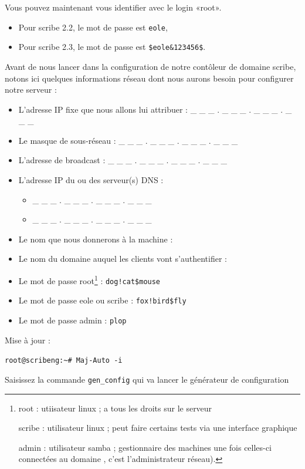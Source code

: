 \documentclass{article}
\begin{document}
Vous pouvez maintenant vous identifier avec le login «root».

\begin{itemize}
\item
  Pour scribe 2.2, le mot de passe est \lstinline!eole!,
\item
  Pour scribe 2.3, le mot de passe est \lstinline!$eole&123456$!.
\end{itemize}
Avant de nous lancer dans la configuration de notre contôleur de domaine
scribe, notons ici quelques informations réseau dont nous aurons besoin
pour configurer notre serveur :

\begin{itemize}
\item
  L'adresse IP fixe que nous allons lui attribuer : \_ \_ \_ . \_ \_ \_
  . \_ \_ \_ . \_ \_ \_
\item
  Le masque de sous-réseau : \_ \_ \_ . \_ \_ \_ . \_ \_ \_ . \_ \_ \_
\item
  L'adresse de broadcast : \_ \_ \_ . \_ \_ \_ . \_ \_ \_ . \_ \_ \_
\item
  L'adresse IP du ou des serveur(s) DNS :
  \begin{itemize}
  \item
    \_ \_ \_ . \_ \_ \_ . \_ \_ \_ . \_ \_ \_
  \item
    \_ \_ \_ . \_ \_ \_ . \_ \_ \_ . \_ \_ \_
  \end{itemize}
\item
  Le nom que nous donnerons à la machine :
\item
  Le nom du domaine auquel les clients vont s'authentifier :
\item
  Le mot de passe root\footnote{root : utiisateur linux ; a tous les
    droits sur le serveur

    scribe : utilisateur linux ; peut faire certains tests via une
    interface graphique

    admin : utilisateur samba ; gestionnaire des machines une fois
    celles-ci connectées au domaine , c'est l'administrateur réseau).} :
  \lstinline"dog!cat$mouse"
\item
  Le mot de passe eole ou scribe : \lstinline"fox!bird$fly"
\item
  Le mot de passe admin : \lstinline!plop!
\end{itemize}
Mise à jour :

\lstinline!root@scribeng:~# Maj-Auto -i!

Saisissez la commande \lstinline!gen_config! qui va lancer le générateur
de configuration
\end{document}
